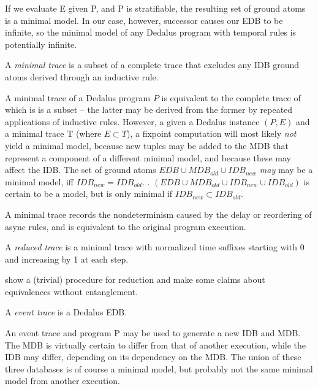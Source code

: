 If we evaluate E given P, and P is stratifiable, the resulting set of ground atoms is a minimal model.
In our case, however, successor causes our EDB to be infinite, so the minimal model of any Dedalus program 
with temporal rules is potentially infinite.  


\begin{definition}
A \emph{minimal trace} is a subset of a complete trace that excludes any IDB ground atoms derived through an inductive
rule.
\end{definition}

A minimal trace of a Dedalus program $P$ is equivalent to the complete trace of which is is a subset -- the latter may be derived from the former by repeated
applications of inductive rules.  However, a given a Dedalus instance $(P, E)$ and a minimal trace T (where $E \subset T$), a fixpoint
computation will most likely \emph{not} yield a minimal model, because new tuples may be added to the MDB that represent a component 
of a different minimal model, and because these may affect the IDB.  The set of ground atoms $EDB \cup MDB_{old} \cup IDB_{new}$
\emph{may} may be a minimal model, iff $IDB_{new} = IDB_{old}$.  .  
$(EDB \cup MDB_{old} \cup IDB_{new} \cup IDB_{old})$ is certain to be a model, but is only minimal if $IDB_{new} \subset IDB_{old}$.

A minimal trace records the nondeterminism caused by the delay or reordering of async rules, and
is equivalent to the original program execution.  

\begin{definition}
A \emph{reduced trace} is a minimal trace with normalized time suffixes starting with 0 and increasing by 1 at each step.
\end{definition}

show a (trivial) procedure for reduction and make some claims about equivalences without entanglement.

\begin{definition}
A \emph{event trace} is a Dedalus EDB.
\end{definition}

An event trace and program P may be used to generate a new IDB and MDB.  The MDB is virtually certain to differ from that of another
execution, while the IDB may differ, depending on its dependency on the MDB.  The union of these three databases is of course a
minimal model, but probably not the same minimal model from another execution.  






